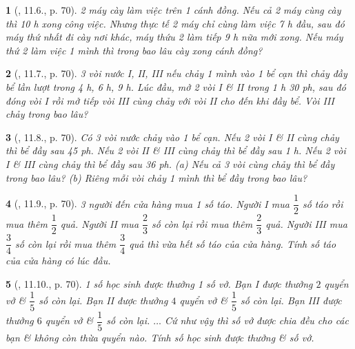 \documentclass{article}
\newtheorem{baitoan}{}
\begin{document}
\begin{baitoan}[\cite{TLCT_THCS_Toan_6_so_hoc}, 11.6., p. 70]
	2 máy cày làm việc trên 1 cánh đồng. Nếu cả 2 máy cùng cày thì {\rm10 h} xong công việc. Nhưng thực tế 2 máy chỉ cùng làm việc {\rm7 h} đầu, sau đó máy thứ nhất đi cày nơi khác, máy thứu 2 làm tiếp {\rm9 h} nữa mới xong. Nếu máy thứ 2 làm việc 1 mình thì trong bao lâu cày xong cánh đồng?
\end{baitoan}

\begin{baitoan}[\cite{TLCT_THCS_Toan_6_so_hoc}, 11.7., p. 70]
	3 vòi nước I, II, III nếu chảy 1 mình vào 1 bể cạn thì chảy đầy bể lần lượt trong {\rm4 h, 6 h, 9 h}. Lúc đầu, mở 2 vòi I \& II trong {\rm1 h 30 ph}, sau đó đóng vòi I rồi mở tiếp vòi III cùng chảy với vòi II cho đến khi đầy bể. Vòi III chảy trong bao lâu?
\end{baitoan}

\begin{baitoan}[\cite{TLCT_THCS_Toan_6_so_hoc}, 11.8., p. 70]
	Có 3 vòi nước chảy vào 1 bể cạn. Nếu 2 vòi I \& II cùng chảy thì bể đầy sau {\rm45 ph}. Nếu 2 vòi II \& III cùng chảy thì bể đầy sau {\rm1 h}. Nếu 2 vòi I \& III cùng chảy thì bể đầy sau {\rm36 ph}. (a) Nếu cả 3 vòi cùng chảy thì bể đầy trong bao lâu? (b) Riêng mỗi vòi chảy 1 mình thì bể đầy trong bao lâu?
\end{baitoan}

\begin{baitoan}[\cite{TLCT_THCS_Toan_6_so_hoc}, 11.9., p. 70]
	3 người đến cửa hàng mua 1 số táo. Người I mua $\dfrac{1}{2}$ số táo rồi mua thêm $\dfrac{1}{2}$ quả. Người II mua $\dfrac{2}{3}$ số còn lại rồi mua thêm $\dfrac{2}{3}$ quả. Người III mua $\dfrac{3}{4}$ số còn lại rồi mua thêm $\dfrac{3}{4}$ quả thì vừa hết số táo của cửa hàng. Tính số táo của cửa hàng có lúc đầu.
\end{baitoan}

\begin{baitoan}[\cite{TLCT_THCS_Toan_6_so_hoc}, 11.10., p. 70]
	1 số học sinh được thưởng 1 số vở. Bạn I được thưởng $2$ quyển vở \& $\dfrac{1}{5}$ số còn lại. Bạn II được thưởng $4$ quyển vở \& $\dfrac{1}{5}$ số còn lại. Bạn III được thưởng $6$ quyển vở \& $\dfrac{1}{5}$ số còn lại. $\ldots$ Cứ như vậy thì số vở được chia đều cho các bạn \& không còn thừa quyển nào. Tính số học sinh được thưởng \& số vở.
\end{baitoan}

\end{document}
